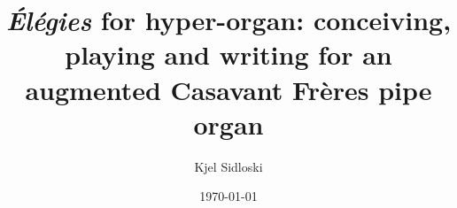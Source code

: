 \documentclass[12pt,twoside,maitrise]{dms_ks}
\theoremstyle{definition}
\begin{document}
\entetedynamique




\title{\textit{Élégies} for hyper-organ: conceiving, playing and writing for an augmented Casavant Frères pipe organ}


\author{Kjel Sidloski}




\date{\today}

\sujet{}








\end{document}
